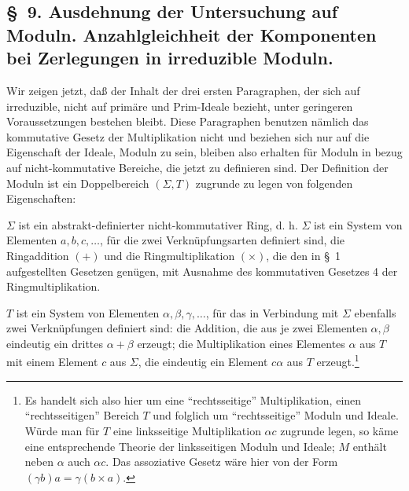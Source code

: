 \documentclass[11pt]{article}
\begin{document}
\setcounter{footnote}{34}

\subsection*{\S~9. Ausdehnung der Untersuchung auf Moduln. Anzahlgleichheit der Komponenten bei Zerlegungen in irreduzible Moduln.}

Wir zeigen jetzt, daß der Inhalt der drei ersten Paragraphen, der sich auf irreduzible, nicht auf primäre und Prim-Ideale bezieht, unter geringeren Voraussetzungen bestehen bleibt. Diese Paragraphen benutzen nämlich das kommutative Gesetz der Multiplikation nicht und beziehen sich nur auf die Eigenschaft der Ideale, Moduln zu sein, bleiben also erhalten für Moduln in bezug auf nicht-kommutative Bereiche, die jetzt zu definieren sind. Der Definition der Moduln ist ein Doppelbereich $(\Sigma,T)$ zugrunde zu legen von folgenden Eigenschaften:

$\Sigma$ ist ein abstrakt-definierter nicht-kommutativer Ring, d. h. $\Sigma$ ist ein System von Elementen $a,b,c,\ldots$, für die zwei Verknüpfungsarten definiert sind, die Ringaddition $(+)$ und die Ringmultiplikation $(\times)$, die den in \S~1 aufgestellten Gesetzen genügen, mit Ausnahme des kommutativen Gesetzes 4 der Ringmultiplikation.

$T$ ist ein System von Elementen $\alpha,\beta,\gamma,\ldots$, für das in Verbindung mit $\Sigma$ ebenfalls zwei Verknüpfungen definiert sind: die Addition, die aus je zwei Elementen $\alpha,\beta$ eindeutig ein drittes $\alpha+\beta$ erzeugt; die Multiplikation eines Elementes $\alpha$ aus $T$ mit einem Element $c$ aus $\Sigma$, die eindeutig ein Element $c\alpha$ aus $T$ erzeugt.\footnote{Es handelt sich also hier um eine ``rechtsseitige'' Multiplikation, einen ``rechtsseitigen'' Bereich $T$ und folglich um ``rechtsseitige'' Moduln und Ideale. Würde man für $T$ eine linksseitige Multiplikation $\alpha c$ zugrunde legen, so käme eine entsprechende Theorie der linksseitigen Moduln und Ideale; $M$ enthält neben $\alpha$ auch $\alpha c$. Das assoziative Gesetz wäre hier von der Form $(\gamma b)a=\gamma(b\times a)$.}
\end{document}
